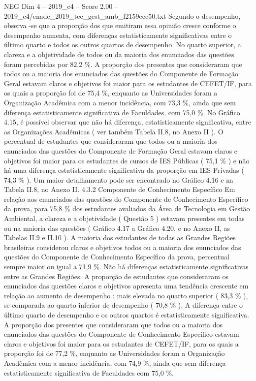 \begin{textsample}{NEG Dim 4 – 2019\_c4 – Score 2.00 – 2019\_c4/enade\_2019\_tec\_gest\_amb\_f2159ecc50.txt}
Segundo o desempenho, observa -se que a proporção dos que emitiram essa opinião cresce conforme o desempenho aumenta, com diferenças estatisticamente significativas entre o último quarto e todos os outros quartos de desempenho.
No quarto superior, a clareza e a objetividade de todos ou da maioria dos enunciados das questões foram percebidas por 82,2 \%.
A proporção dos presentes que consideraram que todos ou a maioria dos enunciados das questões do Componente de Formação Geral estavam claros e objetivos foi maior para os estudantes de CEFET/IF, para os quais a proporção foi de 75,4 \%, enquanto as Universidades foram a Organização Acadêmica com a menor incidência, com 73,3 \%, ainda que sem diferença estatisticamente significativa de Faculdades, com 75,0 \%.
No Gráfico 4.15, é possível observar que não há diferença, estatisticamente significativa, entre as Organizações Acadêmicas ( ver também Tabela II.8, no Anexo II ).
O percentual de estudantes que consideraram que todos ou a maioria dos enunciados das questões do Componente de Formação Geral estavam claros e objetivos foi maior para os estudantes de cursos de IES Públicas ( 75,1 \% ) e não há uma diferença estatisticamente significativa da proporção em IES Privadas ( 74,3 \% ).
Um maior detalhamento pode ser encontrado no Gráfico 4.16 e na Tabela II.8, no Anexo II. 4.3.2 Componente de Conhecimento Específico Em relação aos enunciados das questões do Componente de Conhecimento Específico da prova, para 75,8 \% dos estudantes avaliados da Área de Tecnologia em Gestão Ambiental, a clareza e a objetividade ( Questão 5 ) estavam presentes em todas ou na maioria das questões ( Gráfico 4.17 a Gráfico 4.20, e no Anexo II, as Tabelas II.9 e II.10 ).
A maioria dos estudantes de todas as Grandes Regiões brasileiras considerou claros e objetivos todos ou a maioria dos enunciados das questões do Componente de Conhecimento Específico da prova, percentual sempre maior ou igual a 71,9 \%.
Não há diferenças estatisticamente significativas entre as Grandes Regiões.
A proporção de estudantes que consideraram os enunciados das questões claros e objetivos apresenta uma tendência crescente em relação ao aumento de desempenho : mais elevada no quarto superior ( 83,3 \% ), se comparada ao quarto inferior de desempenho ( 70,8 \% ).
A diferença entre o último quarto de desempenho e os outros quartos é estatisticamente significativa.
A proporção dos presentes que consideraram que todos ou a maioria dos enunciados das questões do Componente de Conhecimento Específico estavam claros e objetivos foi maior para os estudantes de CEFET/IF, para os quais a proporção foi de 77,2 \%, enquanto as Universidades foram a Organização Acadêmica com a menor incidência, com 74,9 \%, ainda que sem diferença estatisticamente significativa de Faculdades com 75,0 \%.

\end{textsample}
